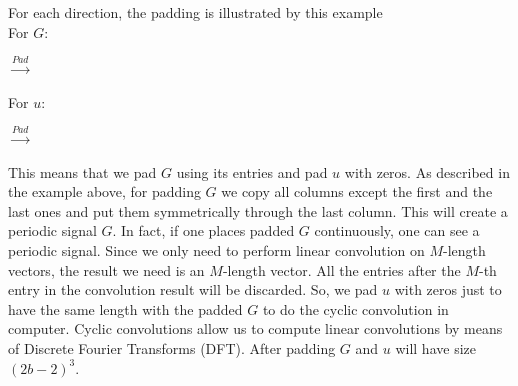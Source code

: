 \documentclass[12pt]{elsarticle}
\numberwithin{equation}{section}
\begin{document}
For each direction, the padding is illustrated by this example \\
For $G$:
\begin{center}
\quad$\xrightarrow{Pad}$\quad
{}
\end{center}
For $u$:
\begin{center}
\quad$\xrightarrow{Pad}$\quad
{}
\end{center}
This means that we pad $G$ using its entries and pad $u$ with zeros. As described in the example above, for padding $G$ we copy all columns except the first and the last ones and put them symmetrically through the last column. This will create a periodic signal $G$. In fact, if one places padded $G$ continuously, one can see a periodic signal. Since we only need to perform linear convolution on $M$-length vectors, the result we need is an $M$-length vector. All the entries after the $M$-th entry in the convolution result will be discarded. So, we pad $u$ with zeros just to have the same length with the padded $G$ to do the cyclic convolution in computer. Cyclic convolutions allow us to compute linear convolutions by means of Discrete Fourier Transforms (DFT). After padding $G$ and $u$ will have size $(2b-2)^3$.
\end{document}
